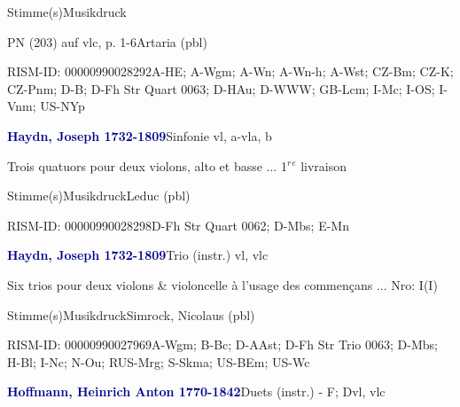 \documentclass[twocolumn, 12pt]{book}
\begin{document}
\par \textcolor{darkblue}{}  Stimme(s)\newline Musikdruck
\par PN (203) auf vlc, p. 1-6\newline Artaria  (pbl)
\par RISM-ID: 00000990028292\newline A-HE; A-Wgm; A-Wn; A-Wn-h; A-Wst; CZ-Bm; CZ-K; CZ-Pnm; D-B; D-Fh  Str Quart 0063; D-HAu; D-WWW; GB-Lcm; I-Mc; I-OS; I-Vnm; US-NYp
\par \vspace{16pt} \textcolor{darkblue}{\textbf{Haydn, Joseph  1732-1809}}\hfillplus{\textbf{[286]}}\newline Sinfonie vl, a-vla, b
\par \begin{itshape}Trois quatuors pour deux violons, alto et basse ... 1$^r$$^e$ livraison\end{itshape} 
\par \textcolor{darkblue}{}  Stimme(s)\newline Musikdruck\newline Leduc  (pbl)
\par RISM-ID: 00000990028298\newline D-Fh  Str Quart 0062; D-Mbs; E-Mn
\par \vspace{16pt} \textcolor{darkblue}{\textbf{Haydn, Joseph  1732-1809}}\hfillplus{\textbf{[287]}}\newline Trio (instr.) vl, vlc
\par \begin{itshape}Six trios pour deux violons \& violoncelle à l'usage des commençans ... Nro: I(I)\end{itshape} 
\par \textcolor{darkblue}{}  Stimme(s)\newline Musikdruck\newline Simrock, Nicolaus  (pbl)
\par RISM-ID: 00000990027969\newline A-Wgm; B-Bc; D-AAst; D-Fh  Str Trio 0063; D-Mbs; H-Bl; I-Nc; N-Ou; RUS-Mrg; S-Skma; US-BEm; US-Wc
\par \vspace{16pt} \textcolor{darkblue}{\textbf{Hoffmann, Heinrich Anton  1770-1842}}\hfillplus{\textbf{[288]}}\newline Duets (instr.) - F; D\newline vl, vlc
\end{document}
